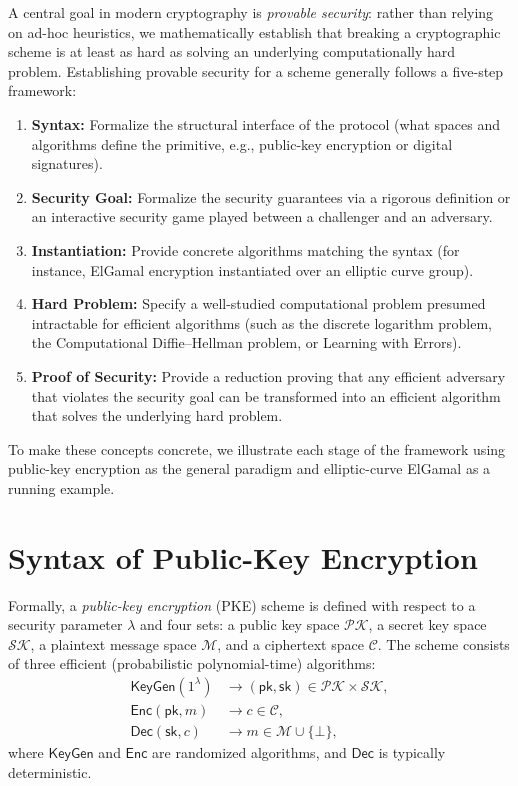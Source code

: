 
A central goal in modern cryptography is \emph{provable security}: rather than relying on ad-hoc heuristics, we mathematically establish that breaking a cryptographic scheme is at least as hard as solving an underlying computationally hard problem.
Establishing provable security for a scheme generally follows a five-step framework:
\begin{enumerate}
    \item \textbf{Syntax:} Formalize the structural interface of the protocol (what spaces and algorithms define the primitive, e.g., public-key encryption or digital signatures).
    \item \textbf{Security Goal:} Formalize the security guarantees via a rigorous definition or an interactive security game played between a challenger and an adversary.
    \item \textbf{Instantiation:} Provide concrete algorithms matching the syntax (for instance, ElGamal encryption instantiated over an elliptic curve group).
    \item \textbf{Hard Problem:} Specify a well-studied computational problem presumed intractable for efficient algorithms (such as the discrete logarithm problem, the Computational Diffie--Hellman problem, or Learning with Errors).
    \item \textbf{Proof of Security:} Provide a reduction proving that any efficient adversary that violates the security goal can be transformed into an efficient algorithm that solves the underlying hard problem.
\end{enumerate}

To make these concepts concrete, we illustrate each stage of the framework using public-key encryption as the general paradigm and elliptic-curve ElGamal as a running example.

\section*{Syntax of Public-Key Encryption}

Formally, a \emph{public-key encryption} (PKE) scheme is defined with respect to a security parameter \(\lambda\) and four sets: a public key space \(\mathcal{PK}\), a secret key space \(\mathcal{SK}\), a plaintext message space \(\mathcal{M}\), and a ciphertext space \(\mathcal{C}\).
The scheme consists of three efficient (probabilistic polynomial-time) algorithms:
\begin{align*}
    \mathsf{KeyGen}(1^\lambda) &\to (\mathsf{pk}, \mathsf{sk}) \in \mathcal{PK} \times \mathcal{SK}, \\
    \mathsf{Enc}(\mathsf{pk}, m) &\to c \in \mathcal{C}, \\
    \mathsf{Dec}(\mathsf{sk}, c) &\to m \in \mathcal{M} \cup \{\bot\},
\end{align*}
where \(\mathsf{KeyGen}\) and \(\mathsf{Enc}\) are randomized algorithms, and \(\mathsf{Dec}\) is typically deterministic.

